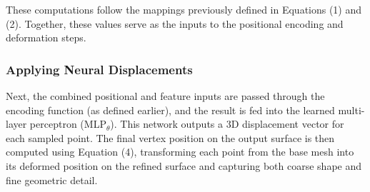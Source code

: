 These computations follow the mappings previously defined in Equations (1) and (2). 
Together, these values serve as the inputs to the positional encoding and deformation steps. 

\subsubsection{Applying Neural Displacements}

Next, the combined positional and feature inputs are passed through the encoding function (as defined earlier), and the result is fed into the learned multi-layer perceptron (MLP$_\theta$). 
This network outputs a 3D displacement vector for each sampled point. 
The final vertex position on the output surface is then computed using Equation (4), transforming each point from the base mesh into its deformed position on the refined surface and capturing both coarse shape and fine geometric detail. 





